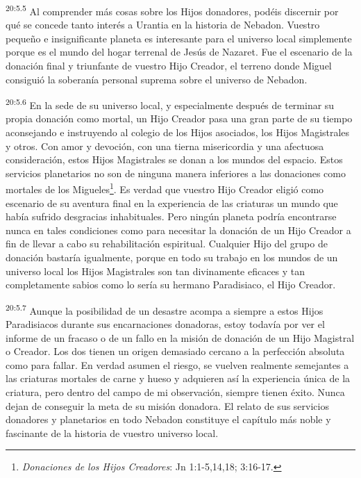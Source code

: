 \par
\textsuperscript{20:5.5} Al comprender más cosas sobre los Hijos donadores, podéis discernir por qué se concede tanto interés a Urantia en la historia de Nebadon. Vuestro pequeño e insignificante planeta es interesante para el universo local simplemente porque es el mundo del hogar terrenal de Jesús de Nazaret. Fue el escenario de la donación final y triunfante de vuestro Hijo Creador, el terreno donde Miguel consiguió la soberanía personal suprema sobre el universo de Nebadon.

\par
\textsuperscript{20:5.6} En la sede de su universo local, y especialmente después de terminar su propia donación como mortal, un Hijo Creador pasa una gran parte de su tiempo aconsejando e instruyendo al colegio de los Hijos asociados, los Hijos Magistrales y otros. Con amor y devoción, con una tierna misericordia y una afectuosa consideración, estos Hijos Magistrales se donan a los mundos del espacio. Estos servicios planetarios no son de ninguna manera inferiores a las donaciones como mortales de los Migueles\footnote{\textit{Donaciones de los Hijos Creadores}: Jn 1:1-5,14,18; 3:16-17.}. Es verdad que vuestro Hijo Creador eligió como escenario de su aventura final en la experiencia de las criaturas un mundo que había sufrido desgracias inhabituales. Pero ningún planeta podría encontrarse nunca en tales condiciones como para necesitar la donación de un Hijo Creador a fin de llevar a cabo su rehabilitación espiritual. Cualquier Hijo del grupo de donación bastaría igualmente, porque en todo su trabajo en los mundos de un universo local los Hijos Magistrales son tan divinamente eficaces y tan completamente sabios como lo sería su hermano Paradisiaco, el Hijo Creador.

\par
\textsuperscript{20:5.7} Aunque la posibilidad de un desastre acompa a siempre a estos Hijos Paradisiacos durante sus encarnaciones donadoras, estoy todavía por ver el informe de un fracaso o de un fallo en la misión de donación de un Hijo Magistral o Creador. Los dos tienen un origen demasiado cercano a la perfección absoluta como para fallar. En verdad asumen el riesgo, se vuelven realmente semejantes a las criaturas mortales de carne y hueso y adquieren así la experiencia única de la criatura, pero dentro del campo de mi observación, siempre tienen éxito. Nunca dejan de conseguir la meta de su misión donadora. El relato de sus servicios donadores y planetarios en todo Nebadon constituye el capítulo más noble y fascinante de la historia de vuestro universo local.

